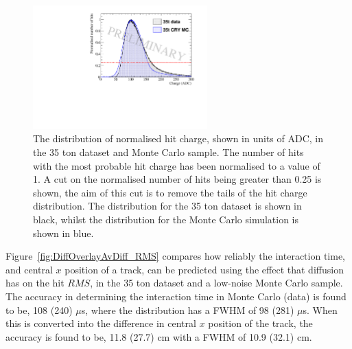\begin{figure}[h!]
  \centering
  \includegraphics[width=0.6\textwidth]{ChargeCutOverlay}
  \caption[The distribution of normalised hit charge in the 35 ton dataset and a Monte Carlo sample]
          {The distribution of normalised hit charge, shown in units of ADC, in the 35 ton dataset and Monte Carlo sample. The number of hits with the most probable hit charge has been normalised to a value of 1. A cut on the normalised number of hits being greater than 0.25 is shown, the aim of this cut is to remove the tails of the hit charge distribution. The distribution for the 35 ton dataset is shown in black, whilst the distribution for the Monte Carlo simulation is shown in blue.}
  \label{fig:DiffOverlay_ChargeCut}
\end{figure}

Figure~\ref{fig:DiffOverlayAvDiff_RMS} compares how reliably the interaction time, and central $x$ position of a track, can be predicted using the effect that diffusion has on the hit $RMS$, in the 35 ton dataset and a low-noise Monte Carlo sample. The accuracy in determining the interaction time in Monte Carlo (data) is found to be, 108 (240) $\mu$s, where the distribution has a FWHM of 98 (281) $\mu$s. When this is converted into the difference in central $x$ position of the track, the accuracy is found to be, 11.8 (27.7) cm with a FWHM of 10.9 (32.1) cm. \\

